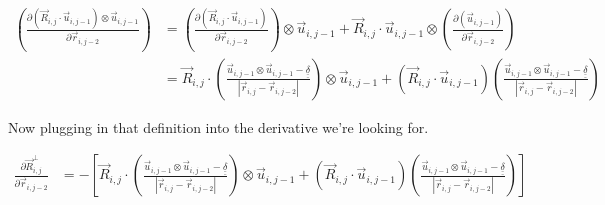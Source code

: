 \documentclass{article}
\renewcommand{\ij}{_{i,j}}
\newcommand{\ijj}{_{i,j-1}}
\newcommand{\ijk}{_{i,j-2}}
\newcommand{\ijjj}{_{i,j-2}}
\newcommand{\magn}[1]{\left\vert #1 \right\vert }
\renewcommand{\part}[2]{\frac{\partial #1 }{\partial #2}}
\newcommand{\ten}[1]{\underline{\underline{#1}}}
\newcommand{\rij}{\vec{r} \ij}
\newcommand{\Rij}{\vec{R} \ij}
\newcommand{\rijjj}{\vec{r} \ijjj}
\newcommand{\uijj}{\vec{u} \ijj}
\begin{document}
\begin{align*}
  \left(  
  \part{
  \left(\vec{R}\ij \cdot \vec{u} \ijj \right)\otimes \uijj}{\vec{r}\ijk}  
  \right)
  &= 
  \left(  
  \part{
  \left(\vec{R}\ij \cdot \vec{u} \ijj \right)}{\vec{r}\ijk}  
  \right)
  \otimes \uijj 
  + 
  \vec{R}\ij \cdot \vec{u} \ijj
  \otimes
  \left(  
  \part{
  ( \uijj  )}{\vec{r}\ijk}  
  \right)
  \\
  &= 
  \Rij \cdot 
  \left(
    \frac{\uijj \otimes \uijj - \ten{\delta}}{\magn{\rij - \rijjj}}
  \right)
  \otimes \uijj 
  + 
  \left(
  \vec{R}\ij \cdot \vec{u} \ijj
  \right)
  {
  \left(
  \frac{\uijj \otimes \uijj - \ten{\delta} }{\magn{\rij - \rijjj}}
  \right)
  }
\end{align*}



Now plugging in that definition into the derivative we're looking for.

\begin{align*}
  \part{\vec{R}\ij ^ \bot}{\vec{r}\ijk}  &=  
  -\left[
  \Rij \cdot 
  \left(
    \frac{\uijj \otimes \uijj - \ten{\delta}}{\magn{\rij - \rijjj}}
  \right)
  \otimes \uijj 
  + 
  \left(
  \vec{R}\ij \cdot \vec{u} \ijj
  \right)
  {
  \left(
  \frac{\uijj \otimes \uijj - \ten{\delta} }{\magn{\rij - \rijjj}}
  \right)
  }
  \right]
\end{align*}
\end{document}
